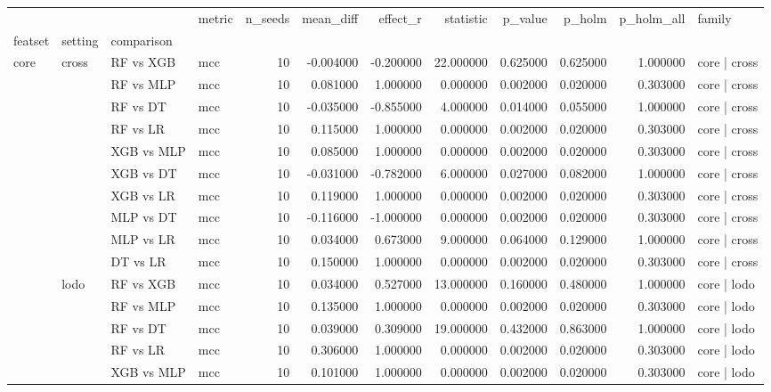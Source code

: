 \begin{tabular}{llllrrrrrrrl}
\toprule
 &  &  & metric & n_seeds & mean_diff & effect_r & statistic & p_value & p_holm & p_holm_all & family \\
featset & setting & comparison &  &  &  &  &  &  &  &  &  \\
\midrule
\multirow[t]{20}{*}{core} & \multirow[t]{10}{*}{cross} & RF vs XGB & mcc & 10 & -0.004000 & -0.200000 & 22.000000 & 0.625000 & 0.625000 & 1.000000 & core | cross \\
 &  & RF vs MLP & mcc & 10 & 0.081000 & 1.000000 & 0.000000 & 0.002000 & 0.020000 & 0.303000 & core | cross \\
 &  & RF vs DT & mcc & 10 & -0.035000 & -0.855000 & 4.000000 & 0.014000 & 0.055000 & 1.000000 & core | cross \\
 &  & RF vs LR & mcc & 10 & 0.115000 & 1.000000 & 0.000000 & 0.002000 & 0.020000 & 0.303000 & core | cross \\
 &  & XGB vs MLP & mcc & 10 & 0.085000 & 1.000000 & 0.000000 & 0.002000 & 0.020000 & 0.303000 & core | cross \\
 &  & XGB vs DT & mcc & 10 & -0.031000 & -0.782000 & 6.000000 & 0.027000 & 0.082000 & 1.000000 & core | cross \\
 &  & XGB vs LR & mcc & 10 & 0.119000 & 1.000000 & 0.000000 & 0.002000 & 0.020000 & 0.303000 & core | cross \\
 &  & MLP vs DT & mcc & 10 & -0.116000 & -1.000000 & 0.000000 & 0.002000 & 0.020000 & 0.303000 & core | cross \\
 &  & MLP vs LR & mcc & 10 & 0.034000 & 0.673000 & 9.000000 & 0.064000 & 0.129000 & 1.000000 & core | cross \\
 &  & DT vs LR & mcc & 10 & 0.150000 & 1.000000 & 0.000000 & 0.002000 & 0.020000 & 0.303000 & core | cross \\
\cline{2-12}
 & \multirow[t]{10}{*}{lodo} & RF vs XGB & mcc & 10 & 0.034000 & 0.527000 & 13.000000 & 0.160000 & 0.480000 & 1.000000 & core | lodo \\
 &  & RF vs MLP & mcc & 10 & 0.135000 & 1.000000 & 0.000000 & 0.002000 & 0.020000 & 0.303000 & core | lodo \\
 &  & RF vs DT & mcc & 10 & 0.039000 & 0.309000 & 19.000000 & 0.432000 & 0.863000 & 1.000000 & core | lodo \\
 &  & RF vs LR & mcc & 10 & 0.306000 & 1.000000 & 0.000000 & 0.002000 & 0.020000 & 0.303000 & core | lodo \\
 &  & XGB vs MLP & mcc & 10 & 0.101000 & 1.000000 & 0.000000 & 0.002000 & 0.020000 & 0.303000 & core | lodo \\

\end{tabular}
